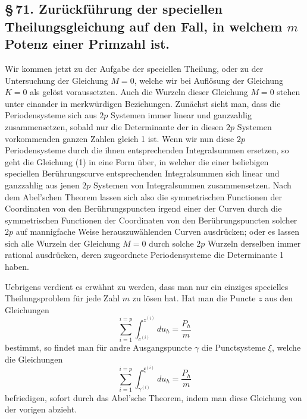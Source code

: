 \documentclass[10pt]{article}
\begin{document}
\subsection*{\S\,71. Zurückführung der speciellen Theilungsgleichung auf den Fall, in welchem \(m\) Potenz einer Primzahl ist.}

Wir kommen jetzt zu der Aufgabe der speciellen Theilung, oder zu der Untersuchung der Gleichung \(M=0\), welche wir bei Auflösung der Gleichung \(K=0\) als gelöst voraussetzten. Auch die Wurzeln dieser Gleichung \(M=0\) stehen unter einander in merkwürdigen Beziehungen. Zunächst sieht man, dass die Periodensysteme sich aus \(2p\) Systemen immer linear und ganzzahlig zusammensetzen, sobald nur die Determinante der in diesen \(2p\) Systemen vorkommenden ganzen Zahlen gleich 1 ist. Wenn wir nun diese \(2p\) Periodensysteme durch die ihnen entsprechenden Integralsummen ersetzen, so geht die Gleichung (1) in eine Form über, in welcher die einer beliebigen speciellen Berührungscurve entsprechenden Integralsummen sich linear und ganzzahlig aus jenen \(2p\) Systemen von Integralsummen zusammensetzen. Nach dem Abel'schen Theorem lassen sich also die symmetrischen Functionen der Coordinaten von den Berührungspuncten irgend einer der Curven durch die symmetrischen Functionen der Coordinaten von den Berührungspuncten solcher \(2p\) auf mannigfache Weise herauszuwählenden Curven ausdrücken; oder es lassen sich alle Wurzeln der Gleichung \(M=0\) durch solche \(2p\) Wurzeln derselben immer rational ausdrücken, deren zugeordnete Periodensysteme die Determinante 1 haben.

Uebrigens verdient es erwähnt zu werden, dass man nur ein einziges specielles Theilungsproblem für jede Zahl \(m\) zu lösen hat. Hat man die Puncte \(z\) aus den Gleichungen
\[
\sum_{i=1}^{i=p}\int_{c^{(i)}}^{z^{(i)}}du_h=\frac{P_h}{m}
\]
bestimmt, so findet man für andre Ausgangspuncte \(\gamma\) die Punctsysteme \(\xi\), welche die Gleichungen
\[
\sum_{i=1}^{i=p}\int_{\gamma^{(i)}}^{\xi^{(i)}}du_h=\frac{P_h}{m}
\]
befriedigen, sofort durch das Abel'sche Theorem, indem man diese Gleichung von der vorigen abzieht.
\end{document}
